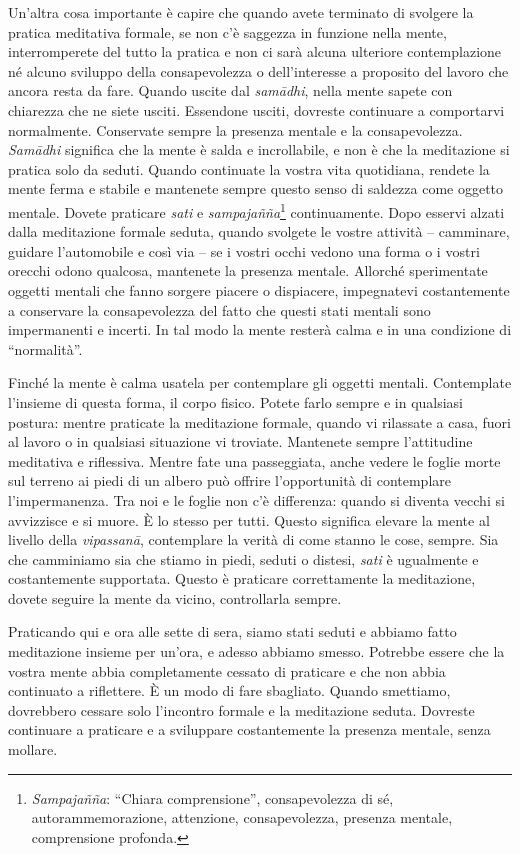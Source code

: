 Un'altra cosa importante è capire che quando avete terminato di svolgere
la pratica meditativa formale, se non c'è saggezza in funzione nella
mente, interromperete del tutto la pratica e non ci sarà alcuna
ulteriore contemplazione né alcuno sviluppo della consapevolezza o
dell'interesse a proposito del lavoro che ancora resta da fare. Quando
uscite dal \emph{samādhi}, nella mente sapete con chiarezza che ne siete
usciti. Essendone usciti, dovreste continuare a comportarvi normalmente.
Conservate sempre la presenza mentale e la consapevolezza.
\emph{Samādhi} significa che la mente è salda e incrollabile, e non è
che la meditazione si pratica solo da seduti. Quando continuate la
vostra vita quotidiana, rendete la mente ferma e stabile e mantenete
sempre questo senso di saldezza come oggetto mentale. Dovete praticare
\emph{sati} e \emph{sampajañña}\footnote{\emph{Sampajañña}: ``Chiara
  comprensione'', consapevolezza di sé, autorammemorazione, attenzione,
  consapevolezza, presenza mentale, comprensione profonda.}
continuamente. Dopo esservi alzati dalla meditazione formale seduta,
quando svolgete le vostre attività -- camminare, guidare l'automobile e
così via -- se i vostri occhi vedono una forma o i vostri orecchi odono
qualcosa, mantenete la presenza mentale. Allorché sperimentate oggetti
mentali che fanno sorgere piacere o dispiacere, impegnatevi
costantemente a conservare la consapevolezza del fatto che questi stati
mentali sono impermanenti e incerti. In tal modo la mente resterà calma
e in una condizione di ``normalità''.

Finché la mente è calma usatela per contemplare gli oggetti mentali.
Contemplate l'insieme di questa forma, il corpo fisico. Potete farlo
sempre e in qualsiasi postura: mentre praticate la meditazione formale,
quando vi rilassate a casa, fuori al lavoro o in qualsiasi situazione vi
troviate. Mantenete sempre l'attitudine meditativa e riflessiva. Mentre
fate una passeggiata, anche vedere le foglie morte sul terreno ai piedi
di un albero può offrire l'opportunità di contemplare l'impermanenza.
Tra noi e le foglie non c'è differenza: quando si diventa vecchi si
avvizzisce e si muore. È lo stesso per tutti. Questo significa elevare
la mente al livello della \emph{vipassanā}, contemplare la verità di
come stanno le cose, sempre. Sia che camminiamo sia che stiamo in piedi,
seduti o distesi, \emph{sati} è ugualmente e costantemente supportata.
Questo è praticare correttamente la meditazione, dovete seguire la mente
da vicino, controllarla sempre.

Praticando qui e ora alle sette di sera, siamo stati seduti e abbiamo
fatto meditazione insieme per un'ora, e adesso abbiamo smesso. Potrebbe
essere che la vostra mente abbia completamente cessato di praticare e
che non abbia continuato a riflettere. È un modo di fare sbagliato.
Quando smettiamo, dovrebbero cessare solo l'incontro formale e la
meditazione seduta. Dovreste continuare a praticare e a sviluppare
costantemente la presenza mentale, senza mollare.

